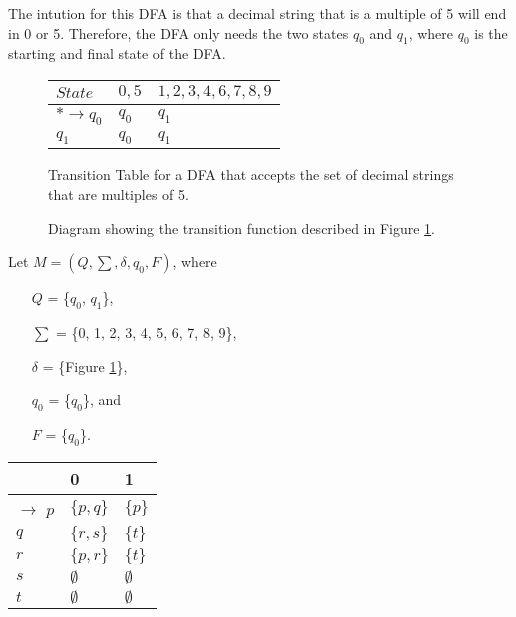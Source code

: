 \documentclass[12pt]{article}
\begin{document}


The intution for this DFA is that a decimal string that is a multiple of 5 will
end in 0 or 5. Therefore, the DFA only needs the two states $q_0$ and $q_1$,
where $q_0$ is the starting and final state of the DFA.

\begin{figure}[ht]
    \centering
    \begin{tabular}{l||l|l}
        $State$            & $0,5$ & $1,2,3,4,6,7,8,9$ \\
        \hline\hline
        $*\rightarrow q_0$ & $q_0$ & $q_1$             \\
        \hline
        $q_1$              & $q_0$ & $q_1$             \\
        \hline
    \end{tabular}
    \caption{Transition Table for a DFA that accepts the set of decimal strings
        that are multiples of 5.}
    \label{tab:dfa_1_func}
\end{figure}

\begin{figure}[h]
    
    \caption{Diagram showing the transition function described in Figure
        \ref{tab:dfa_1_func}.}
\end{figure}

Let $M = (Q, \sum, \delta, q_0, F)$, where
\begin{itemize}
    \item[$Q$] = \{$q_0$, $q_1$\},
    \item[$\sum$] = \{0, 1, 2, 3, 4, 5, 6, 7, 8, 9\},
    \item[$\delta$] = \{Figure \ref{tab:dfa_1_func}\},
    \item[$q_0$] = \{$q_0$\}, and
    \item[$F$] = \{$q_0$\}.
\end{itemize}




\begin{table}[ht]
    \centering
    \begin{tabular}{l||l|l}
                          & 0           & 1           \\
        \hline
        $\rightarrow$ $p$ & $\{p,q\}$   & $\{p\}$     \\
        \hline
        $q$               & $\{r,s\}$   & $\{t\}$     \\
        \hline
        $r$               & $\{p,r\}$   & $\{t\}$     \\
        \hline
        $s$               & $\emptyset$ & $\emptyset$ \\
        \hline
        $t$               & $\emptyset$ & $\emptyset$ \\
        \hline
    \end{tabular}
    \label{tab:p2_nfa}
\end{table}
\end{document}
